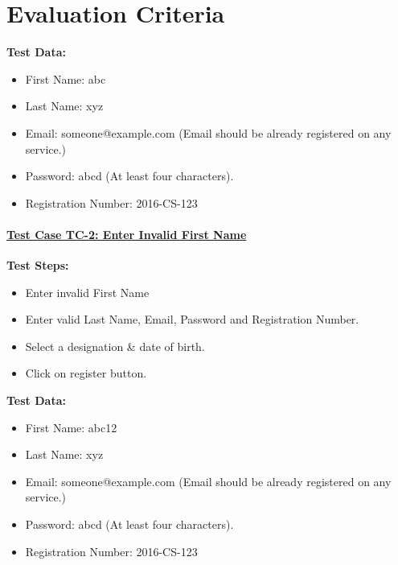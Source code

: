﻿%

\chapter{Evaluation Criteria} %
\label{Chapter5}


\textbf{Test Data:}
\begin{itemize}

\item First Name: abc
\item Last Name: xyz
\item Email: someone@example.com (Email should be already registered on any service.)
\item Password: abcd (At least four characters).
\item Registration Number: 2016-CS-123

\end{itemize}

\subsubsection{\underline{Test Case TC-2: Enter Invalid First Name}}
\textbf{Test Steps:}
\begin{itemize}

\item Enter invalid First Name
\item Enter valid Last Name, Email, Password and Registration Number.
\item Select a designation \& date of birth.
\item Click on register button.

\end{itemize}

\textbf{Test Data:}
\begin{itemize}

\item First Name: abc12
\item Last Name: xyz
\item Email: someone@example.com (Email should be already registered on any service.)
\item Password: abcd (At least four characters).
\item Registration Number: 2016-CS-123

\end{itemize}

